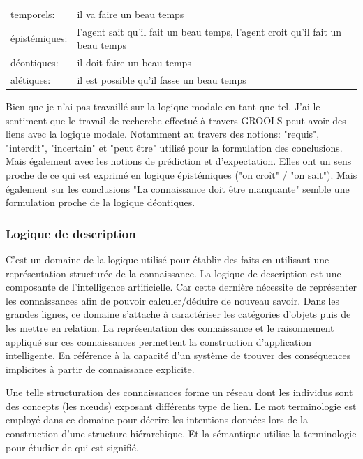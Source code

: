 \begin{refsegment}
    \begin{tabular}{ll}
        temporels:      & il va faire un beau temps \\
        épistémiques:   & l'agent sait qu'il fait un beau temps,  l'agent croit qu'il fait un beau temps \\
        déontiques:     & il doit faire un beau temps \\
        alétiques:      & il est possible qu'il fasse un beau temps \\
    \end{tabular}

    Bien que je n'ai pas travaillé sur la logique modale en tant que tel. J'ai le sentiment que le travail de recherche effectué à travers \gls{GROOLS} peut avoir des liens avec la logique modale. Notamment au travers des notions: "requis", "interdit", "incertain" et "peut être" utilisé pour la formulation des conclusions. Mais également avec les notions de prédiction et d'expectation. Elles ont un sens proche de ce qui est exprimé en logique épistémiques ("on croît" / "on sait"). Mais également sur les conclusions "La connaissance doit être manquante" semble une formulation proche de la logique déontiques.
    
    
    
    \subsubsection{Logique de description}
    
    C'est un domaine de la logique utilisé pour établir des faits en utilisant une représentation structurée de la connaissance. La logique de description est une composante de l'intelligence artificielle. Car cette dernière nécessite de représenter les connaissances afin de pouvoir calculer/déduire de nouveau savoir. Dans les grandes lignes, ce domaine s'attache à caractériser les catégories d'objets puis de les mettre en relation. La représentation des connaissance et le raisonnement appliqué sur ces connaissances permettent la construction d'application intelligente. En référence à la capacité d'un système de trouver des conséquences implicites à partir de connaissance explicite.
    
    Une telle structuration des connaissances forme un réseau dont les individus sont des concepts (les nœuds) exposant différents type de lien. Le mot terminologie est employé dans ce domaine pour décrire les intentions données lors de la construction d'une structure hiérarchique. Et la sémantique utilise la terminologie pour étudier de qui est signifié.
    

\end{refsegment}
